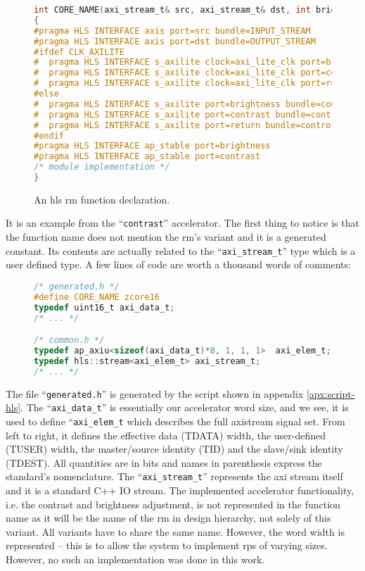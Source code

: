 \begin{figure}[h!]
\centering
\begin{lstlisting}[style=basic,language=C]
int CORE_NAME(axi_stream_t& src, axi_stream_t& dst, int brightness, int contrast)
{
#pragma HLS INTERFACE axis port=src bundle=INPUT_STREAM
#pragma HLS INTERFACE axis port=dst bundle=OUTPUT_STREAM
#ifdef CLK_AXILITE
#  pragma HLS INTERFACE s_axilite clock=axi_lite_clk port=brightness bundle=control offset=0x10
#  pragma HLS INTERFACE s_axilite clock=axi_lite_clk port=contrast bundle=control offset=0x18
#  pragma HLS INTERFACE s_axilite clock=axi_lite_clk port=return bundle=control offset=0x38
#else
#  pragma HLS INTERFACE s_axilite port=brightness bundle=control offset=0x10
#  pragma HLS INTERFACE s_axilite port=contrast bundle=control offset=0x18
#  pragma HLS INTERFACE s_axilite port=return bundle=control offset=0x38
#endif
#pragma HLS INTERFACE ap_stable port=brightness
#pragma HLS INTERFACE ap_stable port=contrast
/* module implementation */
}
\end{lstlisting}
\caption{An \gls{hls} \gls{rm} function declaration.}
\label{lst:func-declaration}
\end{figure}
It is an example from the ``\texttt{contrast}'' accelerator. 
The first thing to notice is that the function name does not 
mention the \gls{rm}'s variant and it is a generated constant. 
Its contents are actually related to the ``\texttt{axi\_stream\_t}'' type 
which is a user defined type. A few lines of code are worth a thousand words of comments:

\begin{figure}[H]
\centering
\begin{lstlisting}[style=basic,language=C]
/* generated.h */
#define CORE_NAME zcore16
typedef uint16_t axi_data_t;
/* ... */

/* common.h */
typedef ap_axiu<sizeof(axi_data_t)*8, 1, 1, 1>  axi_elem_t;
typedef hls::stream<axi_elem_t> axi_stream_t;
/* ... */
\end{lstlisting}
\end{figure}

The file ``\texttt{generated.h}'' is generated by the script shown in appendix \ref{apx:script-hls}.
The ``\texttt{axi\_data\_t}'' is essentially our accelerator word size, and we see, it is used
to define ``\texttt{axi\_elem\_t} which describes the full \gls{axistream} signal set.
From left to right, it defines the effective data (TDATA) width, the user-defined (TUSER)
width, the master/source identity (TID) and the slave/sink identity (TDEST). All quantities are
in bits and names in parenthesis express the standard's nomenclature. 
The ``\texttt{axi\_stream\_t}'' represents the \gls{axi} stream itself 
and it is a standard C++ IO stream. The implemented accelerator functionality, 
i.e. the contrast and brightness adjustment, is not represented in the function name as it
will be the name of the \gls{rm} in design hierarchy, not solely of this variant. All variants
have to share the same name. However, the word width is represented -- this is to allow the
system to implement \glspl{rp} of varying sizes. However, no such an implementation was done
in this work.

